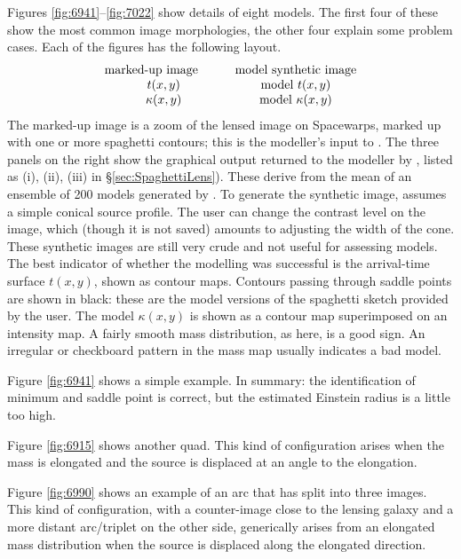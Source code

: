 \FloatBarrier

Figures \ref{fig:6941}--\ref{fig:7022} show details of eight models.
The first four of these show the most common image morphologies, the
other four explain some problem cases.  Each of the figures has the
following layout.
$$ \begin{matrix}
\hbox{marked-up image} \qquad &\hbox{model synthetic image} \\
t(x,y)                        &\hbox{model } t(x,y) \\
\kappa(x,y)                   &\hbox{model } \kappa(x,y)
\end{matrix} $$
The marked-up image is a zoom of the lensed image on Spacewarps,
marked up with one or more spaghetti contours; this is the modeller's
input to \spl.  The three panels on the right show the graphical
output returned to the modeller by \spl, listed as (i), (ii), (iii) in
\S\ref{sec:SpaghettiLens}).  These derive from the mean of an ensemble
of 200 models generated by \spl.  To generate the synthetic image,
\spl assumes a simple conical source profile.  The user can change the
contrast level on the image, which (though it is not saved) amounts to
adjusting the width of the cone.  These synthetic images are still
very crude and not useful for assessing models.  The best indicator of
whether the modelling was successful is the arrival-time surface
$t(x,y)$, shown as contour maps. Contours passing through saddle
points are shown in black: these are the model versions of the
spaghetti sketch provided by the user.  The model $\kappa(x,y)$ is
shown as a contour map superimposed on an intensity map. A fairly
smooth mass distribution, as here, is a good sign.  An irregular or
checkboard pattern in the mass map usually indicates a bad model.

Figure \ref{fig:6941} shows a simple example.  In summary: the
identification of minimum and saddle point is correct, but the
estimated Einstein radius is a little too high.

Figure \ref{fig:6915} shows another quad.  This kind of configuration
arises when the mass is elongated and the source is displaced at an
angle to the elongation.

Figure \ref{fig:6990} shows an example of an arc that has split into
three images.  This kind of configuration, with a counter-image close
to the lensing galaxy and a more distant arc/triplet on the other
side, generically arises from an elongated mass distribution when the
source is displaced along the elongated direction.

